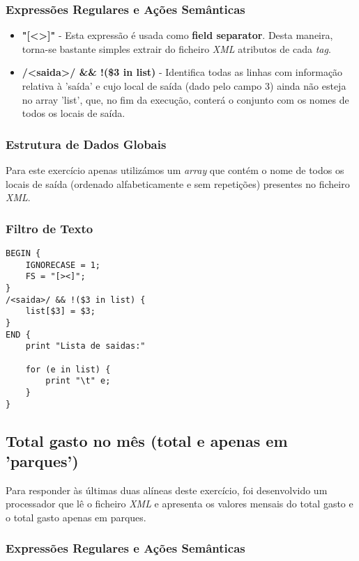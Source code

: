\documentclass{article}
\begin{document}
\subsubsection{Expressões Regulares e Ações Semânticas}

\begin{itemize}
    \item \textbf{"[\textless\textgreater]"} - Esta expressão é usada como \textbf{field separator}. Desta maneira, torna-se bastante simples extrair do ficheiro \emph{XML} atributos de cada \emph{tag}.
    \item \textbf{/\textless saida\textgreater/ && !(\$3 in list)} - Identifica todas as linhas com informação relativa à 'saída' e cujo local de saída (dado pelo campo 3) ainda não esteja no array 'list', que, no fim da execução, conterá o conjunto com os nomes de todos os locais de saída.
\end{itemize}

\subsubsection{Estrutura de Dados Globais}

Para este exercício apenas utilizámos um \emph{array} que contém o nome de todos os locais de saída (ordenado alfabeticamente e sem repetições) presentes no ficheiro \emph{XML}.

\subsubsection{Filtro de Texto}

\begin{lstlisting}
BEGIN {
	IGNORECASE = 1;
	FS = "[><]";
}
/<saida>/ && !($3 in list) {
	list[$3] = $3;
}
END {
	print "Lista de saidas:" 

	for (e in list) {
		print "\t" e;
	}
}
\end{lstlisting}

\subsection{Total gasto no mês (total e apenas em 'parques')}

Para responder às últimas duas alíneas deste exercício, foi desenvolvido um processador que lê o ficheiro \emph{XML} e apresenta os valores mensais do total gasto e o total gasto apenas em parques.

\subsubsection{Expressões Regulares e Ações Semânticas}
\end{document}
